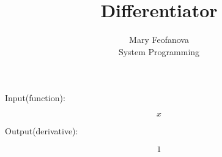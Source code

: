 \documentclass[12pt]{article}
\begin{document}
\title{Differentiator}
\author{Mary Feofanova\\
System Programming}
 
\maketitle
\begin{center}
Input(function):
\end{center}
$$x$$
\begin{center}
Output(derivative):
\end{center}
$$1$$
\end{document}
